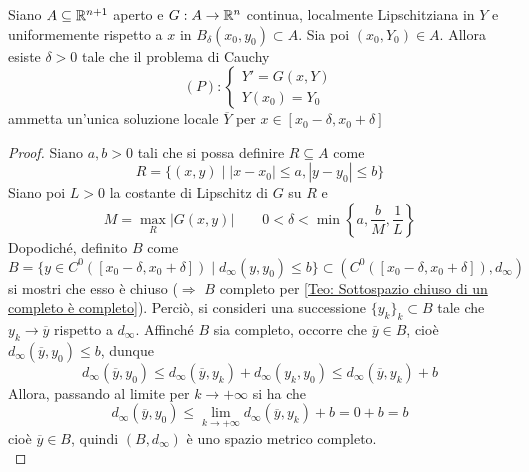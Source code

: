 \begin{theorem}
    Siano $A \subseteq \mathbb{R}^{n+1}$ aperto e $G:A \to \mathbb{R}^n$ continua, localmente Lipschitziana in $Y$ e uniformemente rispetto a $x$ in $B_\delta(x_0, y_0) \subset A$. Sia poi $(x_0, Y_0) \in A$. Allora esiste $\delta>0$ tale che il problema di Cauchy
    \begin{equation}
        (P): \begin{cases}
            Y'=G(x, Y)\\
            Y(x_0)=Y_0
        \end{cases}
    \end{equation}
    ammetta un'unica soluzione locale $\overline{Y}$ per $x \in [x_0-\delta, x_0+\delta]$
\end{theorem}
\begin{proof}
Siano $a, b>0$ tali che si possa definire $R \subseteq A$ come
\begin{equation}
    R= \{(x,y) \mid |x-x_0|\leq a, |y-y_0| \leq b \}
\end{equation}
Siano poi $L>0$ la costante di Lipschitz di $G$ su $R$ e 
\begin{equation}
M=\max\limits_{R}{|G(x, y)|} \qquad 0<\delta<\min\left\{a, \frac{b}{M}, \frac{1}{L}\right\}
\end{equation}
Dopodiché, definito $B$ come
\begin{equation}
    B=\{y \in C^0([x_0-\delta, x_0+\delta]) \mid d_\infty(y, y_0) \leq b\} \subset (C^0([x_0-\delta, x_0+\delta]), d_\infty)
\end{equation}
si mostri che esso è chiuso ($\Rightarrow$ $B$ completo per \ref{Teo: Sottospazio chiuso di un completo è completo}).
Perciò, si consideri una successione $\{y_k\}_k \subset B$ tale che $y_k \to \overline{y}$ rispetto a $d_\infty$. Affinché $B$ sia completo, occorre che $\overline{y} \in B$, cioè $d_\infty(\overline{y},y_0)\leq b$, dunque
\begin{equation}
    d_\infty(\overline{y},y_0) \leq d_\infty(\overline{y},y_k)+ d_\infty(y_k,y_0) \leq d_\infty(\overline{y},y_k) +b
\end{equation}
Allora, passando al limite per $k \to +\infty$ si ha che
\begin{equation}
    d_\infty(\overline{y},y_0) \leq \lim_{k \to +\infty}{d_\infty(\overline{y},y_k) +b}= 0+b= b
\end{equation}
cioè $\overline{y} \in B$, quindi $(B, d_\infty)$ è uno spazio metrico completo.\\

\end{proof}
